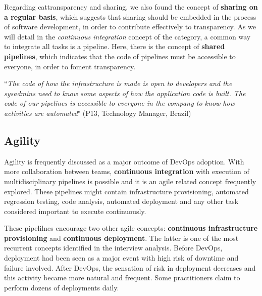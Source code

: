 Regarding cat{transparency and sharing}, we also found the concept of \textbf{sharing on a regular basis}, which suggests
that sharing should be embedded in the process of software
development, in order to contribute effectively to transparency.
As we will detail in the \emph{continuous integration} concept of
the  category, a common way to integrate all tasks is a pipeline. Here, there is the
concept of \textbf{shared pipelines}, which indicates that the code of pipelines
must be accessible to everyone, in order to foment transparency.

\begin{mq}
``\emph{The code of how the infrastructure is
made is open to developers and the sysadmins need to know some aspects of how
the application code is built. The code of our pipelines is accessible to
everyone in the company to know how activities are automated}" (P13, Technology
Manager, Brazil)
\end{mq}




\subsection{Agility}

Agility is frequently discussed as a major outcome of DevOps adoption. With more
collaboration between teams, \textbf{continuous integration} with execution of
multidisciplinary pipelines is possible and it is an agile related concept
frequently explored. These pipelines might contain
infrastructure provisioning, automated regression testing, code analysis,
automated deployment and any other task considered important to
execute continuously.

These pipelilnes encourage two other agile concepts: \textbf{continuous
infrastructure provisioning} and \textbf{continuous deployment}. The latter is
one of the most recurrent concepts identified in the interview analysis. Before
DevOps, deployment had been seen as a major event with high risk of downtime and
failure involved. After DevOps, the sensation of risk in deployment decreases
and this activity became more natural and frequent. Some practitioners claim
to perform dozens of deployments daily.

